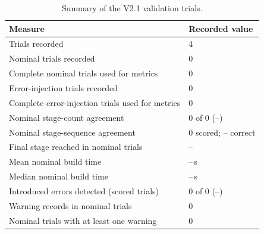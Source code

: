 \begin{table}[H]
\centering
\caption{Summary of the V2.1 validation trials.}
\label{tab:v21_summary}
\renewcommand{\arraystretch}{1.4}
\setlength{\tabcolsep}{8pt}

\begin{tabular}{|p{7.5cm}|p{4.0cm}|}
\hline
\textbf{Measure} & \textbf{Recorded value} \\
\hline
Trials recorded & 4 \\
\hline
Nominal trials recorded & 0 \\
\hline
Complete nominal trials used for metrics & 0 \\
\hline
Error-injection trials recorded & 0 \\
\hline
Complete error-injection trials used for metrics & 0 \\
\hline
Nominal stage-count agreement & 0 of 0 (--) \\
\hline
Nominal stage-sequence agreement & 0 scored; -- correct \\
\hline
Final stage reached in nominal trials & -- \\
\hline
Mean nominal build time & --\,s \\
\hline
Median nominal build time & --\,s \\
\hline
Introduced errors detected (scored trials) & 0 of 0 (--) \\
\hline
Warning records in nominal trials & 0 \\
\hline
Nominal trials with at least one warning & 0 \\
\hline
\end{tabular}
\end{table}